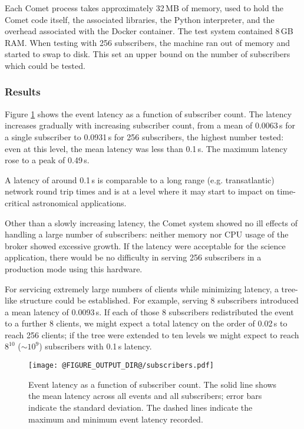 \documentclass[5p,authoryear]{elsarticle}
\begin{document}
Each Comet process takes approximately 32\,MB of memory, used to hold the
Comet code itself, the associated libraries, the Python interpreter, and the
overhead associated with the Docker container. The test system contained 8\,GB
RAM. When testing with 256 subscribers, the machine ran out of memory and
started to swap to disk. This set an upper bound on the number of subscribers
which could be tested.

\subsubsection{Results}

Figure \ref{fig:subscribers} shows the event latency as a function of
subscriber count. The latency increases gradually with increasing subscriber
count, from a mean of 0.0063\,s for a single subscriber to 0.0931\,s for 256
subscribers, the highest number tested: even at this level, the mean latency
was less than 0.1\,s. The maximum latency rose to a peak of 0.49\,s.

A latency of around 0.1\,s is comparable to a long range (e.g. transatlantic)
network round trip times and is at a level where it may start to impact on
time-critical astronomical applications.

Other than a slowly increasing latency, the Comet system showed no
ill effects of handling a large number of subscribers: neither memory nor CPU
usage of the broker showed excessive growth. If the latency were acceptable
for the science application, there would be no difficulty in serving 256
subscribers in a production mode using this hardware.

For servicing extremely large numbers of clients while minimizing latency, a
tree-like structure could be established. For example, serving 8 subscribers
introduced a mean latency of 0.0093\,s. If each of those 8 subscribers
redistributed the event to a further 8 clients, we might expect a total
latency on the order of 0.02\,s to reach 256 clients; if the tree were
extended to ten levels we might expect to reach $8^{10}$ ($\sim 10^9$)
subscribers with 0.1\,s latency.

\begin{figure}
  \begin{center}
  \texttt{[image: @FIGURE\_OUTPUT\_DIR@/subscribers.pdf]}
  \end{center}

  \caption{Event latency as a function of subscriber count. The solid line
  shows the mean latency across all events and all subscribers; error bars
  indicate the standard deviation. The dashed lines indicate the maximum and
  minimum event latency recorded.}

  \label{fig:subscribers}
\end{figure}
\end{document}
